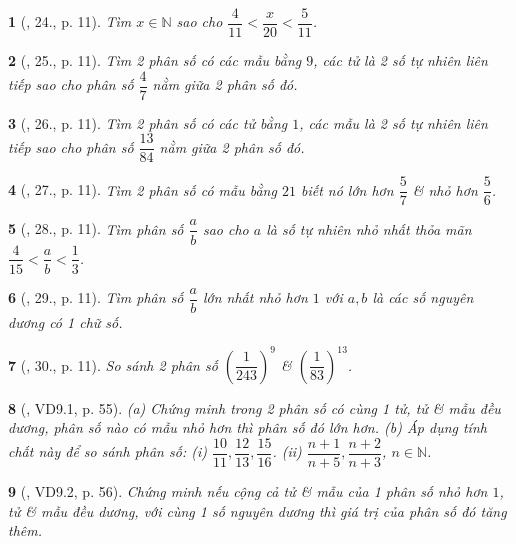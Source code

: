 \documentclass{article}
\newtheorem{baitoan}{}
\begin{document}
\begin{baitoan}[\cite{Binh_Toan_6_tap_2}, 24., p. 11]
	Tìm $x\in\mathbb{N}$ sao cho $\dfrac{4}{11} < \dfrac{x}{20} < \dfrac{5}{11}$.
\end{baitoan}

\begin{baitoan}[\cite{Binh_Toan_6_tap_2}, 25., p. 11]
	Tìm 2 phân số có các mẫu bằng $9$, các tử là 2 số tự nhiên liên tiếp sao cho phân số $\dfrac{4}{7}$ nằm giữa 2 phân số đó.
\end{baitoan}

\begin{baitoan}[\cite{Binh_Toan_6_tap_2}, 26., p. 11]
	Tìm 2 phân số có các tử bằng $1$, các mẫu là 2 số tự nhiên liên tiếp sao cho phân số $\dfrac{13}{84}$ nằm giữa 2 phân số đó.
\end{baitoan}

\begin{baitoan}[\cite{Binh_Toan_6_tap_2}, 27., p. 11]
	Tìm 2 phân số có mẫu bằng $21$ biết nó lớn hơn $\dfrac{5}{7}$ \& nhỏ hơn $\dfrac{5}{6}$.
\end{baitoan}

\begin{baitoan}[\cite{Binh_Toan_6_tap_2}, 28., p. 11]
	Tìm phân số $\dfrac{a}{b}$ sao cho $a$ là số tự nhiên nhỏ nhất thỏa mãn $\dfrac{4}{15} < \dfrac{a}{b} < \dfrac{1}{3}$.
\end{baitoan}

\begin{baitoan}[\cite{Binh_Toan_6_tap_2}, 29., p. 11]
	Tìm phân số $\dfrac{a}{b}$ lớn nhất nhỏ hơn $1$ với $a,b$ là các số nguyên dương có 1 chữ số.
\end{baitoan}

\begin{baitoan}[\cite{Binh_Toan_6_tap_2}, 30., p. 11]
	So sánh 2 phân số $\left(\dfrac{1}{243}\right)^9$ \& $\left(\dfrac{1}{83}\right)^{13}$.
\end{baitoan}

\begin{baitoan}[\cite{TLCT_THCS_Toan_6_so_hoc}, VD9.1, p. 55]
	(a) Chứng minh trong 2 phân số có cùng 1 tử, tử \& mẫu đều dương, phân số nào có mẫu nhỏ hơn thì phân số đó lớn hơn. (b) Áp dụng tính chất này để so sánh phân số: (i) $\dfrac{10}{11},\dfrac{12}{13},\dfrac{15}{16}$. (ii) $\dfrac{n + 1}{n + 5},\dfrac{n + 2}{n + 3}$, $n\in\mathbb{N}$.
\end{baitoan}

\begin{baitoan}[\cite{TLCT_THCS_Toan_6_so_hoc}, VD9.2, p. 56]
	Chứng minh nếu cộng cả tử \& mẫu của 1 phân số nhỏ hơn $1$, tử \& mẫu đều dương, với cùng 1 số nguyên dương thì giá trị của phân số đó tăng thêm.
\end{baitoan}
\end{document}
